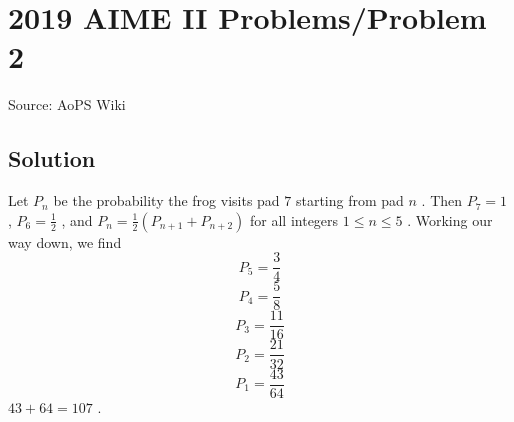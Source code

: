 \documentclass[12pt]{article}
\begin{document}
\section*{{2019 AIME II Problems/Problem 2}}
Source: AoPS Wiki

\subsection*{Solution}
Let $P_n$ be the probability the frog visits pad $7$ starting from pad $n$ . Then $P_7 = 1$ , $P_6 = \frac12$ , and $P_n = \frac12(P_{n + 1} + P_{n + 2})$ for all integers $1 \leq n \leq 5$ . Working our way down, we find \[P_5 = \frac{3}{4}\] \[P_4 = \frac{5}{8}\] \[P_3 = \frac{11}{16}\] \[P_2 = \frac{21}{32}\] \[P_1 = \frac{43}{64}\] $43 + 64 = \boxed{107}$ .
\end{document}
